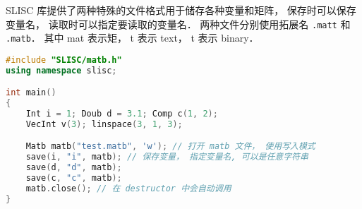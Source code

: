 

SLISC 库提供了两种特殊的文件格式用于储存各种变量和矩阵， 保存时可以保存变量名， 读取时可以指定要读取的变量名． 两种文件分别使用拓展名 \verb|.matt| 和 \verb|.matb|． 其中 mat 表示矩， t 表示 text， t 表示 binary．
\begin{lstlisting}[language=cpp]
#include "SLISC/matb.h"
using namespace slisc;

int main()
{
    Int i = 1; Doub d = 3.1; Comp c(1, 2);
    VecInt v(3); linspace(3, 1, 3);

    Matb matb("test.matb", 'w'); // 打开 matb 文件， 使用写入模式
    save(i, "i", matb); // 保存变量， 指定变量名, 可以是任意字符串
    save(d, "d", matb);
    save(c, "c", matb);
    matb.close(); // 在 destructor 中会自动调用
}
\end{lstlisting}
